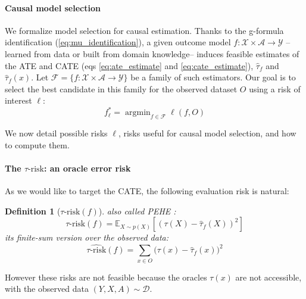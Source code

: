 \documentclass[10pt]{article}
\def\mycitecolor{green!50!black}
\DeclareMathOperator*{\argmin}{argmin} \def\mycitecolor{green!50!black}
\newtheorem{definition}{Definition}
\begin{document}
\begin{multicols}{2}
    \paragraph{Causal model selection}\label{sec:problem:causal_selection}

    We formalize model selection for causal estimation. Thanks to the g-formula
    identification (\autoref{eq:mu_identification}), a given outcome model $f: \mathcal X
        \times \mathcal A \rightarrow \mathcal{Y}$ --learned from data or built from
    domain knowledge-- induces feasible estimates of the ATE and CATE (eqs
    \ref{eq:ate_estimate} and \ref{eq:cate_estimate}), $\hat \tau_{f}$ and $\hat \tau_{f}(x)$.
    Let $\mathcal F=\{f: \mathcal X \times \mathcal A \rightarrow \mathcal{Y}\}$ be
    a family of such estimators. Our goal is to select the best candidate in this
    family for the observed dataset $O$ using a risk of interest
    $\ell$:
    \begin{equation}
        f^*_{\ell} = \argmin_{f \in \mathcal{F}} \ell(f, O)
        \label{eq:causal_model_selection}
    \end{equation}

    We now detail possible risks $\ell$, risks useful for causal
    model selection, and how to compute them.


    \paragraph{The $\tau\text{-risk}$: an oracle error risk}\label{paragraph:oracle_metrics}
    As we would like to target the CATE, the following
    evaluation risk is natural:
    \begin{definition}[$\tau\text{-risk}(f)$]\label{def:tau_risk} also called PEHE
        \cite{schulam_reliable_2017, hill_bayesian_2011}:
        \begin{equation*}\label{eq:tau_risk}
            \tau\text{-risk}(f) = \mathbb E_{X\sim p(X)}[(\tau(X) - \hat \tau_f(X))^2]
        \end{equation*}
        its finite-sum version over the observed data:
        \begin{equation*}
            \widehat{\tau\text{-risk}}(f) = \sum_{x \in O} \big(\tau(x) - \hat \tau_f(x)\big)^2
        \end{equation*}
    \end{definition}

    However these risks are not feasible because the oracles $\tau(x)$ are
    not accessible, with the observed data $(Y, X, A) \sim \mathcal D$.



\end{multicols}
\end{document}
